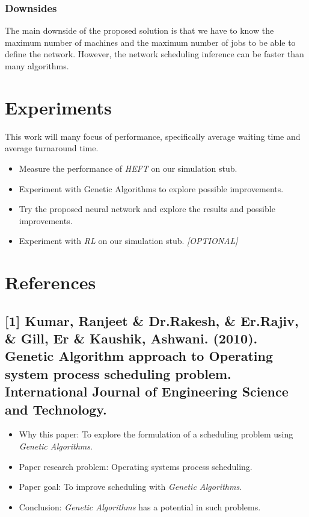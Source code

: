 \documentclass[twocolumn,11pt]{IEEEtran}
\begin{document}
    \subsubsection{Downsides}
    The main downside of the proposed solution is that we have to know the maximum number of machines and the maximum number of jobs to be able to define the network. However, the network scheduling inference can be faster than many algorithms. 
    
    \section{Experiments}
    This work will many focus of performance, specifically average waiting time and average turnaround time. 
    \begin{itemize}
        \item Measure the performance of \emph{HEFT} on our simulation stub.
        \item Experiment with Genetic Algorithms to explore possible improvements.
        \item Try the proposed neural network and explore the results and possible improvements.
        \item Experiment with \emph{RL} on our simulation stub. \emph{[OPTIONAL]}
    \end{itemize}
    
    \section{References}
    \subsection*{[1] Kumar, Ranjeet \& Dr.Rakesh, \& Er.Rajiv, \& Gill, Er \& Kaushik, Ashwani. (2010). Genetic Algorithm approach to Operating system process scheduling problem. International Journal of Engineering Science and Technology.}
    \begin{itemize}
        \item Why this paper: To explore the formulation of a scheduling problem using \emph{Genetic Algorithms}.
        \item Paper research problem: Operating systems process scheduling.
        \item Paper goal: To improve scheduling with \emph{Genetic Algorithms}.
        \item Conclusion: \emph{Genetic Algorithms} has a potential in such problems.
    \end{itemize} 
    
\end{document}
